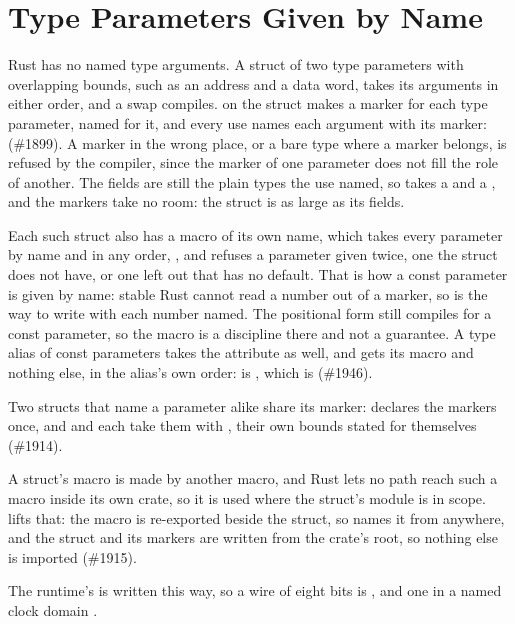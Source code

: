 \section{Type Parameters Given by Name}
\label{sec:x-named-params}

Rust has no named type arguments.
A struct of two type parameters with overlapping bounds, such as an
address and a data word, takes its arguments in either order, and a
swap compiles.
 on the struct makes a marker for each
type parameter, named for it, and every use names each argument with
its marker:  (\#1899).
A marker in the wrong place, or a bare type where a marker belongs, is
refused by the compiler, since the marker of one parameter does not
fill the role of another.
The fields are still the plain types the use named, so 
takes a  and a , and the markers take no room:
the struct is as large as its fields.

Each such struct also has a macro of its own name, which takes every
parameter by name and in any order, , and refuses a parameter given twice, one the struct does not
have, or one left out that has no default.
That is how a const parameter is given by name: stable Rust cannot read
a number out of a marker, so  is
the way to write  with each number named.
The positional form still compiles for a const parameter, so the macro
is a discipline there and not a guarantee.
A type alias of const parameters takes the attribute as well, and gets
its macro and nothing else, in the alias's own order:
 is , which is
 (\#1946).

Two structs that name a parameter alike share its marker:
 declares the markers once,
and  and  each take them with
, their own bounds stated
for themselves (\#1914).

A struct's macro is made by another macro, and Rust lets no path reach
such a macro inside its own crate, so it is used where the struct's
module is in scope.
\code{\#[named\_type\_params(path = crate::port)]} lifts that: the
macro is re-exported beside the struct, so 
names it from anywhere, and the struct and its markers are written from
the crate's root, so nothing else is imported (\#1915).

The runtime's  is written this way, so a wire of eight
bits is , and one in a named clock domain
.




